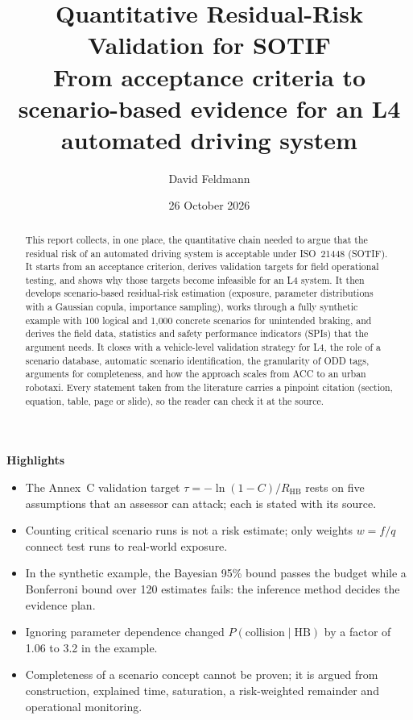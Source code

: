 \documentclass[11pt,a4paper]{article}
\title{\textbf{Quantitative Residual-Risk Validation for SOTIF}\\[4pt]
\large From acceptance criteria to scenario-based evidence for an L4 automated driving system}
\author{David Feldmann}
\date{26 October 2026}
\newcommand{\RHB}{R_{\mathrm{HB}}}
\begin{document}
\maketitle
\thispagestyle{empty}

\begin{abstract}
This report collects, in one place, the quantitative chain needed to argue that the residual risk of an automated driving system is acceptable under ISO~21448 (SOTIF). It starts from an acceptance criterion, derives validation targets for field operational testing, and shows why those targets become infeasible for an L4 system. It then develops scenario-based residual-risk estimation (exposure, parameter distributions with a Gaussian copula, importance sampling), works through a fully synthetic example with 100 logical and 1{,}000 concrete scenarios for unintended braking, and derives the field data, statistics and safety performance indicators (SPIs) that the argument needs. It closes with a vehicle-level validation strategy for L4, the role of a scenario database, automatic scenario identification, the granularity of ODD tags, arguments for completeness, and how the approach scales from ACC to an urban robotaxi. Every statement taken from the literature carries a pinpoint citation (section, equation, table, page or slide), so the reader can check it at the source.
\end{abstract}

\noindent\textbf{Highlights}
{\small
\begin{itemize}[leftmargin=1.2em]
\item The Annex~C validation target $\tau=-\ln(1-C)/\RHB$ rests on five assumptions that an assessor can attack; each is stated with its source.
\item Counting critical scenario runs is not a risk estimate; only weights $w=f/q$ connect test runs to real-world exposure.
\item In the synthetic example, the Bayesian 95\% bound passes the budget while a Bonferroni bound over 120 estimates fails: the inference method decides the evidence plan.
\item Ignoring parameter dependence changed $P(\text{collision}\mid\text{HB})$ by a factor of 1.06 to 3.2 in the example.
\item Completeness of a scenario concept cannot be proven; it is argued from construction, explained time, saturation, a risk-weighted remainder and operational monitoring.
\end{itemize}
}
\end{document}
